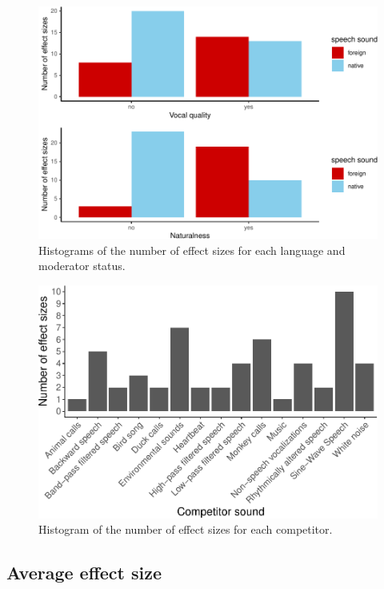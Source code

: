 \documentclass[
  english,
  man]{apa6}
\begin{document}
\begin{figure}
\centering
\includegraphics{MA_speech_pref_files/figure-latex/stimuli-1.pdf}
\caption{\label{fig:stimuli}Histograms of the number of effect sizes for each language and moderator status.}
\end{figure}

\begin{figure}
\centering
\includegraphics{MA_speech_pref_files/figure-latex/competitors-1.pdf}
\caption{\label{fig:competitors}Histogram of the number of effect sizes for each competitor.}
\end{figure}

\hypertarget{average-effect-size}{%
\subsection{Average effect size}\label{average-effect-size}}
\end{document}
